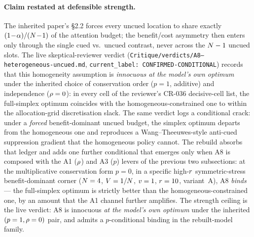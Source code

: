 \paragraph{Claim restated at defensible strength.}
The inherited paper's §2.2 forces every uncued location to share
exactly $(1\!-\!\alpha)/(N\!-\!1)$ of the attention budget; the
benefit/cost asymmetry then enters only through the single cued vs.\
uncued contrast, never across the $N - 1$ uncued slots. The live
skeptical-reviewer verdict
(\texttt{Critique/verdicts/A8--heterogeneous-uncued.md},
\texttt{current\_label: CONFIRMED-CONDITIONAL}) records that this
homogeneity assumption is \emph{innocuous at the model's own optimum}
under the inherited choice of conservation order ($p = 1$,
additive) and independence ($\rho = 0$): in every cell of the
reviewer's CR-036 decisive-cell list, the full-simplex optimum
coincides with the homogeneous-constrained one to within the
allocation-grid discretisation slack. The same verdict logs a
conditional crack: under a \emph{forced} benefit-dominant uncued
budget, the simplex optimum departs from the homogeneous one and
reproduces a Wang--Theeuwes-style anti-cued suppression gradient that
the homogeneous policy cannot. The rebuild absorbs that ledger and
adds one further conditional that emerges only when A8 is composed
with the A1 ($\rho$) and A3 ($p$) levers of the previous two
subsections: at the multiplicative conservation form $p = 0$, in a
specific high-$r$ symmetric-stress benefit-dominant corner
($N = 4$, $V = 1/N$, $v = 1$, $r = 10$,
variant~A), A8 \emph{binds} — the full-simplex optimum is strictly
better than the homogeneous-constrained one, by an amount that the A1
channel further amplifies. The strength ceiling is the live verdict:
A8 is innocuous \emph{at the model's own optimum} under the inherited
$(p = 1, \rho = 0)$ pair, and admits a $p$-conditional binding in
the rebuilt-model family.

